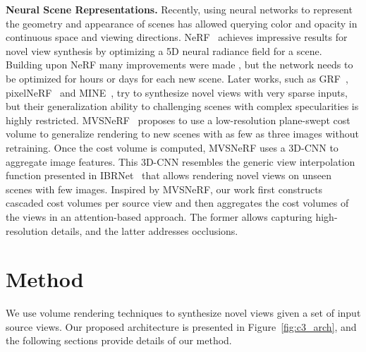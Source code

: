 \noindent\textbf{Neural Scene Representations.} Recently, using neural networks to represent the geometry and appearance of scenes has allowed querying color and opacity in continuous space and viewing directions. NeRF~\citep{mildenhall2020nerf} achieves impressive results for novel view synthesis by optimizing a 5D neural radiance field for a scene. Building upon NeRF many improvements were made \citep{park2021nerfies, li2021neural, martin2021nerf, peng2021neural, schwarz2020graf, srinivasan2021nerv, rockwell2021pixelsynth, DeVries_2021_ICCV, Barron_2021_ICCV}, but the network needs to be optimized for hours or days for each new scene. Later works, such as GRF~\citep{trevithick2021grf}, pixelNeRF~\citep{yu2021pixelnerf} and MINE~\citep{li2021mine}, try to synthesize novel views with very sparse inputs, but their generalization ability to challenging scenes with complex specularities is highly restricted.
MVSNeRF~\citep{chen2021mvsnerf} proposes to use a low-resolution plane-swept cost volume to generalize rendering to new scenes with as few as three images without retraining. Once the cost volume is computed, MVSNeRF uses a 3D-CNN to aggregate image features. This 3D-CNN resembles the generic view interpolation function presented in IBRNet~\citep{wang2021ibrnet} that allows rendering novel views on unseen scenes with few images. Inspired by MVSNeRF, our work first constructs cascaded cost volumes per source view and then aggregates the cost volumes of the views in an attention-based approach. The former allows capturing high-resolution details, and the latter addresses occlusions.

\section{Method}
\label{sec:c3_method}
We use volume rendering techniques to synthesize novel views given a set of input source views. Our proposed architecture is presented in Figure~\ref{fig:c3_arch}, and the following sections provide details of our method.

